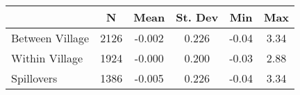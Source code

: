 \begin{tabular}{l*{5}{c}}\hline&\multicolumn{1}{c}{N}&\multicolumn{1}{c}{Mean}&\multicolumn{1}{c}{St. Dev}&\multicolumn{1}{c}{Min}&\multicolumn{1}{c}{Max}\\ \hline 
Between Village & 2126 & -0.002 & 0.226 & -0.04 & 3.34 \\
Within Village & 1924 & -0.000 & 0.200 & -0.03 & 2.88 \\
Spillovers & 1386 & -0.005 & 0.226 & -0.04 & 3.34 \\
\hline \end{tabular}
